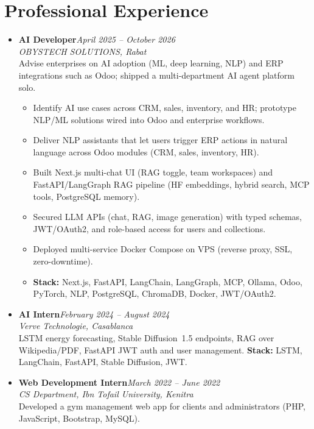 \documentclass[10pt,a4paper]{article}
\newcommand{\role}[2]{\textbf{#1}\hfill\textit{\color{muted}#2}\\}
\newcommand{\org}[1]{\textit{#1}\\[0.5pt]}
\begin{document}
\section*{Professional Experience}
\begin{itemize}
    \item \role{AI Developer}{April 2025 -- October 2026}
          \org{OBYSTECH SOLUTIONS, Rabat}
          Advise enterprises on AI adoption (ML, deep learning, NLP) and ERP integrations such as Odoo; shipped a multi-department AI agent platform solo.
          \begin{itemize}
              \item Identify AI use cases across CRM, sales, inventory, and HR; prototype NLP/ML solutions wired into Odoo and enterprise workflows.
              \item Deliver NLP assistants that let users trigger ERP actions in natural language across Odoo modules (CRM, sales, inventory, HR).
              \item Built Next.js multi-chat UI (RAG toggle, team workspaces) and FastAPI/LangGraph RAG pipeline (HF embeddings, hybrid search, MCP tools, PostgreSQL memory).
              \item Secured LLM APIs (chat, RAG, image generation) with typed schemas, JWT/OAuth2, and role-based access for users and collections.
              \item Deployed multi-service Docker Compose on VPS (reverse proxy, SSL, zero-downtime).
              \item \textbf{Stack:} Next.js, FastAPI, LangChain, LangGraph, MCP, Ollama, Odoo, PyTorch, NLP, PostgreSQL, ChromaDB, Docker, JWT/OAuth2.
          \end{itemize}

    \item \role{AI Intern}{February 2024 -- August 2024}
          \org{Verve Technologie, Casablanca}
          LSTM energy forecasting, Stable Diffusion~1.5 endpoints, RAG over Wikipedia/PDF, FastAPI JWT auth and user management.
          \textbf{Stack:} LSTM, LangChain, FastAPI, Stable Diffusion, JWT.

    \item \role{Web Development Intern}{March 2022 -- June 2022}
          \org{CS Department, Ibn Tofail University, Kenitra}
          Developed a gym management web app for clients and administrators (PHP, JavaScript, Bootstrap, MySQL).
\end{itemize}

\end{document}
